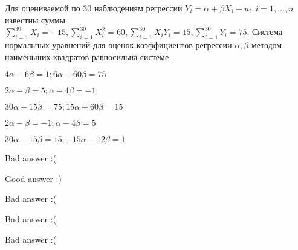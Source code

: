 
\begin{question}
Для оцениваемой по 30 наблюдениям регрессии \(Y_i = \alpha + \beta X_i + u_i, i = 1, \ldots, n\) известны суммы \(\sum_{i=1}^{30} X_i = -15, \sum_{i=1}^{30} X_i^2 = 60, \sum_{i=1}^{30} X_i Y_i = 15, \sum_{i=1}^{30} Y_i = 75\). Система нормальных уравнений для оценок коэффициентов регрессии \(\alpha, \beta\) методом наименьших квадратов равносильна системе
\begin{answerlist}
  \item \(4 \alpha - 6 \beta = 1; 6 \alpha + 60 \beta = 75\)
  \item \(2 \alpha -  \beta = 5;  \alpha - 4 \beta = -1\)
  \item \(30 \alpha + 15 \beta = 75; 15 \alpha + 60 \beta = 15\)
  \item \(2 \alpha - \beta = -1; \alpha - 4 \beta = 5\)
  \item \(30 \alpha - 15 \beta = 15; -15 \alpha - 12 \beta = 1\)
\end{answerlist}
\end{question}

\begin{solution}
\begin{answerlist}
  \item Bad answer :(
  \item Good answer :)
  \item Bad answer :(
  \item Bad answer :(
  \item Bad answer :(
\end{answerlist}
\end{solution}

